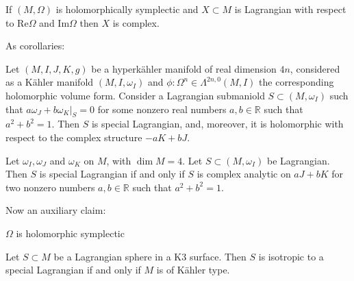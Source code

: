 \begin{lemma}[Hitchin]
\label{lemma-hitchin}
If $(M,\Omega)$ is holomorphically symplectic and $X \subset M$ 
is Lagrangian with respect to $\text{Re}\Omega$ and $\text{Im}\Omega$
then $X$ is complex.
\end{lemma}

\noindent
As corollaries:

\begin{lemma}
\label{lemma-corollary-hitchin}
Let $(M,I,J,K,g)$ be a hyperkähler manifold of real dimension $4n$,
considered as a Kähler manifold $(M,I,\omega_I)$ and $\phi:\Omega^n \in
\Lambda^{2n,0}(M,I)$ the corresponding holomorphic volume form.
Consider a Lagrangian submaniold $S \subset (M,\omega_I)$
such that $a \omega_J + b\omega_K|_S=0$ for some nonzero real numbers
$a,b \in \mathbb{R}$ such that $a^2+b^2=1$.
Then $S$ is special Lagrangian, and, moreover,
it is holomorphic with respect to the complex structure
$-a K+b J$.
\end{lemma}

\begin{lemma}
\label{lemma-corollary2-hitchin}
Let $\omega_I,\omega_J$ and $\omega_K$ on $M$, with $\dim M=4$.
Let $S \subset (M,\omega_I)$ be Lagrangian.
Then $S$ is special Lagrangian if and only if $S$ is complex analytic
on $a J + b K$ for two nonzero numbers  $a,b \in \mathbb{R}$ such that
$a^2+b^2=1$.
\end{lemma}

\noindent
Now an auxiliary claim:

\begin{lemma}
\label{lemma-k3-type}
$\Omega$ is holomorphic symplectic 
\end{lemma}

\begin{theorem}
\label{theorem-}
Let $S\subset M$ be a Lagrangian sphere in a K3 surface.
Then  $S$ is isotropic to a special Lagrangian if and only if
$M$ is of Kähler type.
\end{theorem}











